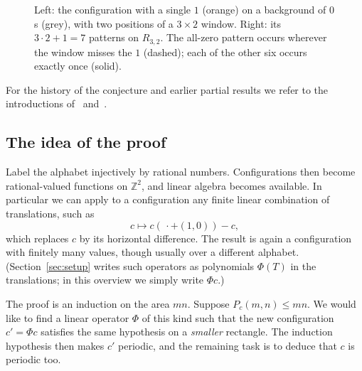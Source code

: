 \documentclass[11pt,a4paper,reqno]{amsart}
\theoremstyle{definition}
\theoremstyle{remark}
\newcommand{\Z}{\mathbb Z}
\numberwithin{equation}{section}
\begin{document}
\begin{figure}[ht]
\centering
{}
\caption{Left: the configuration with a single $1$ (orange) on a background of $0$s (grey), with two positions of a $3\times2$ window. Right: its $3\cdot2+1=7$ patterns on $R_{3,2}$. The all-zero pattern occurs wherever the window misses the $1$ (dashed); each of the other six occurs exactly once (solid).}
\label{fig:onepoint}
\end{figure}

For the history of the conjecture and earlier partial results we refer to the introductions of~\cite{CK} and~\cite{KS}.

\subsection{The idea of the proof}
Label the alphabet injectively by rational numbers. Configurations then become rational-valued functions on $\Z^2$, and linear algebra becomes available. In particular we can apply to a configuration any finite linear combination of translations, such as
\[
 c\mapsto c(\,\cdot+(1,0))-c,
\]
which replaces $c$ by its horizontal difference. The result is again a configuration with finitely many values, though usually over a different alphabet. (Section~\ref{sec:setup} writes such operators as polynomials $\Phi(T)$ in the translations; in this overview we simply write $\Phi c$.)

The proof is an induction on the area $mn$. Suppose $P_c(m,n)\le mn$. We would like to find a linear operator $\Phi$ of this kind such that the new configuration $c'=\Phi c$ satisfies the same hypothesis on a \emph{smaller} rectangle. The induction hypothesis then makes $c'$ periodic, and the remaining task is to deduce that $c$ is periodic too.
\end{document}
